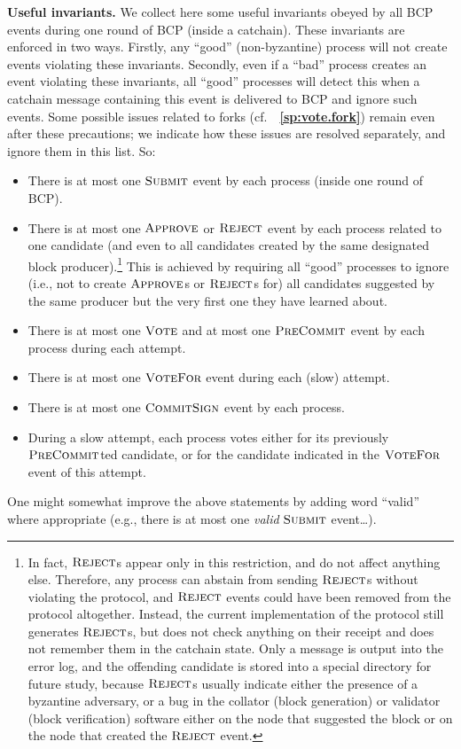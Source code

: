 \documentclass[12pt,oneside]{article}
\def\makepoint#1{\medbreak\noindent{\bf #1.\ }}
\def\nxsubpoint{\refstepcounter{subsubsection}%
  \smallbreak\makepoint{\thesubsubsection}}
\def\refpoint#1{{\rm\textbf{\ref{#1}}}}
\let\ptref=\refpoint
\def\emb#1{\textbf{#1.}}
\def\opsc#1{\operatorname{\textsc{#1}}}
\def\Submit{\opsc{Submit}}
\def\Approve{\opsc{Approve}}
\def\Reject{\opsc{Reject}}
\def\PreCommit{\opsc{PreCommit}}
\def\CommitSign{\opsc{CommitSign}}
\def\Vote{\opsc{Vote}}
\def\VoteFor{\opsc{VoteFor}}
\begin{document}
\nxsubpoint\emb{Useful invariants}
We collect here some useful invariants obeyed by all BCP events during one round of BCP (inside a catchain). These invariants are enforced in two ways. Firstly, any ``good'' (non-byzantine) process will not create events violating these invariants. Secondly, even if a ``bad'' process creates an event violating these invariants, all ``good'' processes will detect this when a catchain message containing this event is delivered to BCP and ignore such events. Some possible issues related to forks (cf.~~\ptref{sp:vote.fork}) remain even after these precautions; we indicate how these issues are resolved separately, and ignore them in this list. So:
\begin{itemize}
\item There is at most one $\Submit$ event by each process (inside one round of BCP).
\item There is at most one $\Approve$ or $\Reject$ event by each process related to one candidate (and even to all candidates created by the same designated block producer).\footnote{In fact, $\Reject$s appear only in this restriction, and do not affect anything else. Therefore, any process can abstain from sending $\Reject$s without violating the protocol, and $\Reject$ events could have been removed from the protocol altogether. Instead, the current implementation of the protocol still generates $\Reject$s, but does not check anything on their receipt and does not remember them in the catchain state. Only a message is output into the error log, and the offending candidate is stored into a special directory for future study, because $\Reject$s usually indicate either the presence of a byzantine adversary, or a bug in the collator (block generation) or validator (block verification) software either on the node that suggested the block or on the node that created the $\Reject$ event.} This is achieved by requiring all ``good'' processes to ignore (i.e., not to create $\Approve$s or $\Reject$s for) all candidates suggested by the same producer but the very first one they have learned about.
\item There is at most one $\Vote$ and at most one $\PreCommit$ event by each process during each attempt.
\item There is at most one $\VoteFor$ event during each (slow) attempt.
\item There is at most one $\CommitSign$ event by each process.
\item During a slow attempt, each process votes either for its previously $\PreCommit$ted candidate, or for the candidate indicated in the $\VoteFor$ event of this attempt.
\end{itemize}
One might somewhat improve the above statements by adding word ``valid'' where appropriate (e.g., there is at most one {\em valid\/} $\Submit$ event\dots).
\end{document}
